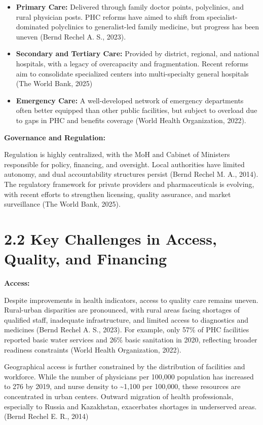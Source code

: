\begin{itemize}
\item
  \textbf{Primary Care:} Delivered through family doctor points,
  polyclinics, and rural physician posts. PHC reforms have aimed to
  shift from specialist-dominated polyclinics to generalist-led family
  medicine, but progress has been uneven (Bernd Rechel A. S., 2023).
\item
  \textbf{Secondary and Tertiary Care:} Provided by district, regional,
  and national hospitals, with a legacy of overcapacity and
  fragmentation. Recent reforms aim to consolidate specialized centers
  into multi-specialty general hospitals (The World Bank, 2025)
\item
  \textbf{Emergency Care:} A well-developed network of emergency
  departments often better equipped than other public facilities, but
  subject to overload due to gaps in PHC and benefits coverage (World
  Health Organization, 2022).
\end{itemize}

\textbf{Governance and Regulation:}

Regulation is highly centralized, with the MoH and Cabinet of Ministers
responsible for policy, financing, and oversight. Local authorities have
limited autonomy, and dual accountability structures persist (Bernd
Rechel M. A., 2014). The regulatory framework for private providers and
pharmaceuticals is evolving, with recent efforts to strengthen
licensing, quality assurance, and market surveillance (The World Bank,
2025).

\section{\texorpdfstring{\textbf{2.2 Key Challenges in Access, Quality,
and
Financing}}{2.2 Key Challenges in Access, Quality, and Financing}}\label{key-challenges-in-access-quality-and-financing}

\textbf{Access:}

Despite improvements in health indicators, access to quality care
remains uneven. Rural-urban disparities are pronounced, with rural areas
facing shortages of qualified staff, inadequate infrastructure, and
limited access to diagnostics and medicines (Bernd Rechel A. S., 2023).
For example, only 57\% of PHC facilities reported basic water services
and 26\% basic sanitation in 2020, reflecting broader readiness
constraints (World Health Organization, 2022).

Geographical access is further constrained by the distribution of
facilities and workforce. While the number of physicians per 100,000
population has increased to 276 by 2019, and nurse density to
\textasciitilde1,100 per 100,000, these resources are concentrated in
urban centers. Outward migration of health professionals, especially to
Russia and Kazakhstan, exacerbates shortages in underserved areas.
(Bernd Rechel E. R., 2014)

